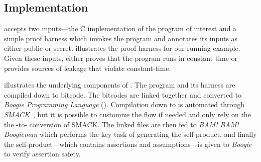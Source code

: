 
\subsection{\ctVerif Implementation}
\label{sec:background-tool}

\ctVerif accepts two inputs---the C implementation of the program of interest and a simple proof harness which invokes the program and annotates its inputs as either public or secret.
 illustrates the proof harness for our running example.
Given these inputs, \ctVerif either proves that the program runs in constant time or provides sources of leakage that violate constant-time. 

 illustrates the underlying components of \ctVerif.
The program and its harness are compiled down to  bitcode. The
bitcodes are linked together and converted to \emph{Boogie Programming
Language} (). Compilation down to  is automated
through \emph{SMACK}~\cite{smack}, but it is possible to customize the flow if
needed and only rely on the the -to- conversion
of SMACK.
The linked  files are then fed to \emph{BAM! BAM! Boogieman} which
performs the key task of generating the self-product, and
finally the self-product---which contains assertions and assumptions---is
given to \emph{Boogie}~\cite{boogie} to verify assertion safety.

